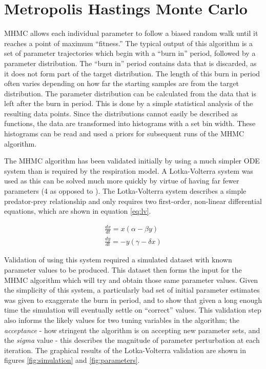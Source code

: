 \section{Metropolis Hastings Monte Carlo}

MHMC allows each individual parameter to follow a biased random walk until it reaches a point of maximum ``fitness.'' The typical output of this algorithm is a set of parameter trajectories which begin with a ``burn in'' period, followed by a parameter distribution. The ``burn in'' period contains data that is discarded, as it does not form part of the target distribution. The length of this burn in period often varies depending on how far the starting samples are from the target distribution. The parameter distribution can be calculated from the data that is left after the burn in period. This is done by a simple statistical analysis of the resulting data points. Since the distributions cannot easily be described as functions, the data are transformed into histograms with a set bin width. These histograms can be read and used a priors for subsequent runs of the MHMC algorithm.

The MHMC algorithm has been validated initially by using a much simpler ODE system than is required by the respiration model. A Lotka-Volterra system was used as this can be solved much more quickly by virtue of having far fewer parameters (4 as opposed to ). The Lotka-Volterra system describes a simple predator-prey relationship and only requires two first-order, non-linear differential equations, which are shown in equation \ref{eq:lv}.

\begin{eqnarray}
\frac{dx}{dt} = x (\alpha - \beta y)\nonumber \\
\frac{dy}{dt} = -y (\gamma - \delta x)
\label{eq:lv}
\end{eqnarray}

Validation of using this system required a simulated dataset with known parameter values to be produced. This dataset then forms the input for the MHMC algorithm which will try and obtain those same parameter values. Given the simplicity of this system, a particularly bad set of initial parameter estimates was given to exaggerate the burn in period, and to show that given a long enough time the simulation will eventually settle on ``correct'' values. This validation step also informs the likely values for two tuning variables in the algorithm; the \textit{acceptance} - how stringent the algorithm is on accepting new parameter sets, and the \textit{sigma} value - this describes the magnitude of parameter perturbation at each iteration.
The graphical results of the Lotka-Volterra validation are shown in figures \ref{fig:simulation} and \ref{fig:parameters}.

